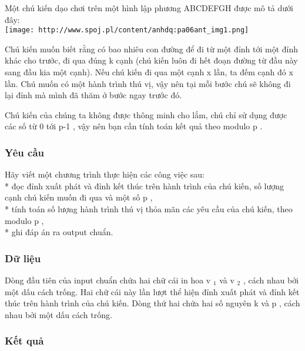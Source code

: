 



   Một chú kiến dạo chơi trên một hình lập phương ABCDEFGH được mô tả dưới đây:   
\\
\texttt{[image: http://www.spoj.pl/content/anhdq:pa06ant\_img1.png]}



   Chú kiến muốn biết rằng có bao nhiêu con đường để đi từ một đỉnh tới một đỉnh khác cho trước, đi qua đúng       k      cạnh (chú kiến luôn đi hết đoạn đường từ đầu này sang đầu kia một cạnh). Nếu chú kiến đi qua một cạnh       x      lần, ta đếm cạnh đó       x      lần. Chú muốn có một hành trình thú vị, vậy nên tại mỗi bước chú sẽ không đi lại đỉnh mà mình đã thăm ở bước ngay trước đó.  

   Chú kiến của chúng ta không được thông minh cho lắm, chú chỉ sử dụng được các số từ       0      tới       p-1      , vậy nên bạn cần tính toán kết quả theo modulo       p      .  

\subsubsection{   Yêu cầu  }

   Hãy viết một chương trình thực hiện các công việc sau:   
\\   * đọc đỉnh xuất phát và đỉnh kết thúc trên hành trình của chú kiến, số lượng cạnh chú kiến muốn đi qua và một số       p      ,   
\\   * tính toán số lượng hành trình thú vị thỏa mãn các yêu cầu của chú kiến, theo modulo       p      ,   
\\   * ghi đáp án ra output chuẩn.  

\subsubsection{   Dữ liệu  }

   Dòng đầu tiên của input chuẩn chứa hai chữ cái in hoa       v    $_     1    $      và       v    $_     2    $      , cách nhau bởi một dấu cách trống. Hai chữ cái này lần lượt thể hiện đỉnh xuất phát và đỉnh kết thúc trên hành trình của chú kiến. Dòng thứ hai chứa hai số nguyên       k      và       p      , cách nhau bởi một dấu cách trống.  

\subsubsection{   Kết quả  }

